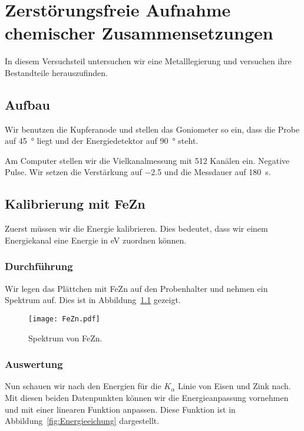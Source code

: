 \chapter{Zerstörungsfreie Aufnahme chemischer Zusammensetzungen}

In diesem Versuchsteil untersuchen wir eine Metalllegierung und versuchen ihre
Bestandteile herauszufinden.

\section{Aufbau}

Wir benutzen die Kupferanode und stellen das Goniometer so ein, dass die Probe
auf \SI{45}{\degree} liegt und der Energiedetektor auf \SI{90}{\degree} steht.

Am Computer stellen wir die Vielkanalmessung mit 512 Kanälen ein. Negative
Pulse. Wir setzen die Verstärkung auf \num{-2.5} und die Messdauer auf
\SI{180}{\second}.

\section{Kalibrierung mit FeZn}

Zuerst müssen wir die Energie kalibrieren. Dies bedeutet, dass wir einem
Energiekanal eine Energie in \si{\electronvolt} zuordnen können.

\subsection{Durchführung}

Wir legen das Plättchen mit FeZn auf den Probenhalter und nehmen ein Spektrum
auf. Dies ist in Abbildung~\ref{fig:FeZn} gezeigt.

\begin{figure}[htbp]
    \centering
    \texttt{[image: FeZn.pdf]}
    \caption{%
        Spektrum von FeZn.
    }
    \label{fig:FeZn}
\end{figure}

\subsection{Auswertung}

Nun schauen wir \cite[Tabelle~1-2]{x-ray_data_booklet} nach den Energien für
die $K_\alpha$ Linie von Eisen und Zink nach. Mit diesen beiden Datenpunkten
können wir die Energieanpassung vornehmen und mit einer linearen Funktion
anpassen. Diese Funktion ist in Abbildung~\ref{fig:Energieeichung} dargestellt.

